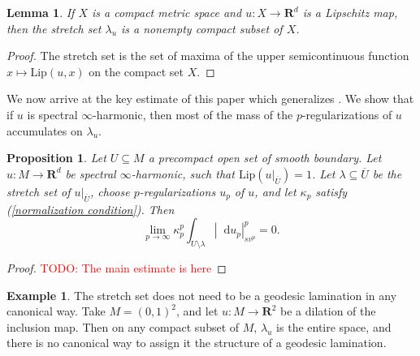 \documentclass[reqno,11pt]{amsart}
\newcommand{\RR}{\mathbf{R}}
\newcommand*\dif{\mathop{}\!\mathrm{d}}
\newcommand{\Lip}{\mathrm{Lip}}
\newtheorem{lemma}[theorem]{Lemma}
\newtheorem{proposition}[theorem]{Proposition}
\theoremstyle{definition}
\newtheorem{example}[theorem]{Example}
\numberwithin{equation}{section}
\newcommand\todo[1]{\textcolor{red}{TODO: #1}}
\begin{document}
\begin{lemma}\label{stretch set is compact}
If $X$ is a compact metric space and $u: X \to \RR^d$ is a Lipschitz map, then the stretch set $\lambda_u$ is a nonempty compact subset of $X$.
\end{lemma}
\begin{proof}
The stretch set is the set of maxima of the upper semicontinuous function $x \mapsto \Lip(u, x)$ on the compact set $X$.
\end{proof}

We now arrive at the key estimate of this paper which generalizes \cite[Proposition 6.5]{daskalopoulos2022transverse}.
We show that if $u$ is spectral $\infty$-harmonic, then most of the mass of the $p$-regularizations of $u$ accumulates on $\lambda_u$.

\begin{proposition}\label{main estimate}
Let $U \subseteq M$ a precompact open set of smooth boundary.
Let $u: M \to \RR^d$ be spectral $\infty$-harmonic, such that $\Lip(u|_{\overline U}) = 1$.
Let $\lambda \subseteq \overline U$ be the stretch set of $u|_{\overline U}$, choose $p$-regularizations $u_p$ of $u$, and let $\kappa_p$ satisfy (\ref{normalization condition}).
Then
$$\lim_{p \to \infty} \kappa_p^p \int_{U \setminus \lambda} |\dif u_p|_{sv^p}^p  = 0.$$
\end{proposition}
\begin{proof}
\todo{The main estimate is here}
\end{proof}

\begin{example}
The stretch set does not need to be a geodesic lamination in any canonical way.
Take $M = (0, 1)^2$, and let $u: M \to \RR^2$ be a dilation of the inclusion map.
Then on any compact subset of $M$, $\lambda_u$ is the entire space, and there is no canonical way to assign it the structure of a geodesic lamination.
\end{example}

\end{document}
